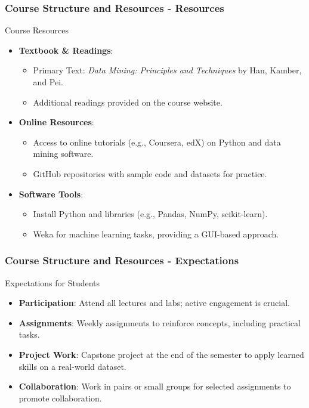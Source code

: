 \documentclass{beamer}
\begin{document}
\begin{frame}[fragile]
    \frametitle{Course Structure and Resources - Resources}
    \begin{block}{Course Resources}
        \begin{itemize}
            \item \textbf{Textbook \& Readings}: 
                \begin{itemize}
                    \item Primary Text: \textit{Data Mining: Principles and Techniques} by Han, Kamber, and Pei.
                    \item Additional readings provided on the course website.
                \end{itemize}
            \item \textbf{Online Resources}:
                \begin{itemize}
                    \item Access to online tutorials (e.g., Coursera, edX) on Python and data mining software.
                    \item GitHub repositories with sample code and datasets for practice.
                \end{itemize}
            \item \textbf{Software Tools}:
                \begin{itemize}
                    \item Install Python and libraries (e.g., Pandas, NumPy, scikit-learn).
                    \item Weka for machine learning tasks, providing a GUI-based approach.
                \end{itemize}
        \end{itemize}
    \end{block}
\end{frame}

\begin{frame}[fragile]
    \frametitle{Course Structure and Resources - Expectations}
    \begin{block}{Expectations for Students}
        \begin{itemize}
            \item \textbf{Participation}: Attend all lectures and labs; active engagement is crucial.
            \item \textbf{Assignments}: Weekly assignments to reinforce concepts, including practical tasks.
            \item \textbf{Project Work}: Capstone project at the end of the semester to apply learned skills on a real-world dataset.
            \item \textbf{Collaboration}: Work in pairs or small groups for selected assignments to promote collaboration.
        \end{itemize}
    \end{block}
\end{frame}
\end{document}
